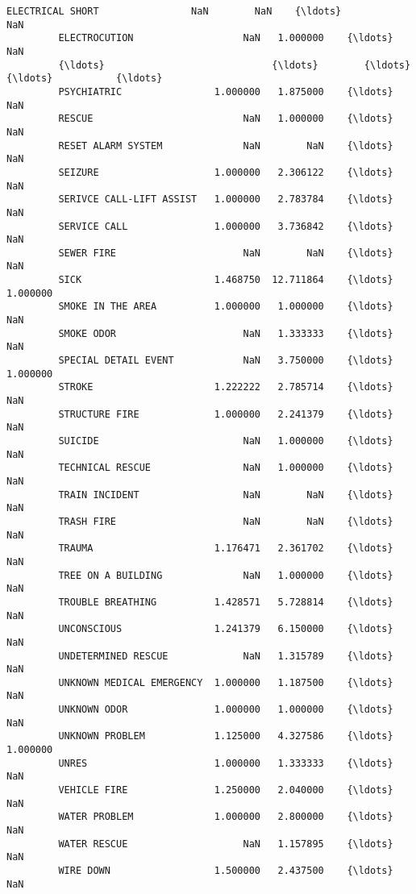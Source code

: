 \documentclass[11pt]{article}
\begin{document}
\begin{Verbatim}[commandchars=\\\{\}]
         ELECTRICAL SHORT                NaN        NaN    {\ldots}           NaN   
         ELECTROCUTION                   NaN   1.000000    {\ldots}           NaN   
         {\ldots}                             {\ldots}        {\ldots}    {\ldots}           {\ldots}   
         PSYCHIATRIC                1.000000   1.875000    {\ldots}           NaN   
         RESCUE                          NaN   1.000000    {\ldots}           NaN   
         RESET ALARM SYSTEM              NaN        NaN    {\ldots}           NaN   
         SEIZURE                    1.000000   2.306122    {\ldots}           NaN   
         SERIVCE CALL-LIFT ASSIST   1.000000   2.783784    {\ldots}           NaN   
         SERVICE CALL               1.000000   3.736842    {\ldots}           NaN   
         SEWER FIRE                      NaN        NaN    {\ldots}           NaN   
         SICK                       1.468750  12.711864    {\ldots}      1.000000   
         SMOKE IN THE AREA          1.000000   1.000000    {\ldots}           NaN   
         SMOKE ODOR                      NaN   1.333333    {\ldots}           NaN   
         SPECIAL DETAIL EVENT            NaN   3.750000    {\ldots}      1.000000   
         STROKE                     1.222222   2.785714    {\ldots}           NaN   
         STRUCTURE FIRE             1.000000   2.241379    {\ldots}           NaN   
         SUICIDE                         NaN   1.000000    {\ldots}           NaN   
         TECHNICAL RESCUE                NaN   1.000000    {\ldots}           NaN   
         TRAIN INCIDENT                  NaN        NaN    {\ldots}           NaN   
         TRASH FIRE                      NaN        NaN    {\ldots}           NaN   
         TRAUMA                     1.176471   2.361702    {\ldots}           NaN   
         TREE ON A BUILDING              NaN   1.000000    {\ldots}           NaN   
         TROUBLE BREATHING          1.428571   5.728814    {\ldots}           NaN   
         UNCONSCIOUS                1.241379   6.150000    {\ldots}           NaN   
         UNDETERMINED RESCUE             NaN   1.315789    {\ldots}           NaN   
         UNKNOWN MEDICAL EMERGENCY  1.000000   1.187500    {\ldots}           NaN   
         UNKNOWN ODOR               1.000000   1.000000    {\ldots}           NaN   
         UNKNOWN PROBLEM            1.125000   4.327586    {\ldots}      1.000000   
         UNRES                      1.000000   1.333333    {\ldots}           NaN   
         VEHICLE FIRE               1.250000   2.040000    {\ldots}           NaN   
         WATER PROBLEM              1.000000   2.800000    {\ldots}           NaN   
         WATER RESCUE                    NaN   1.157895    {\ldots}           NaN   
         WIRE DOWN                  1.500000   2.437500    {\ldots}           NaN   
         

\end{Verbatim}
\end{document}
